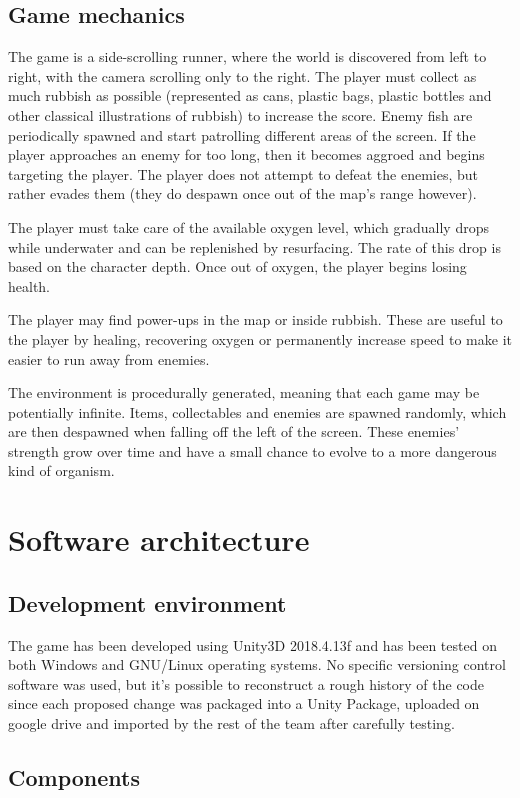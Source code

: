 \documentclass[11pt]{article}
\begin{document}
\subsection{Game mechanics}
The game is a side-scrolling runner, where the world is discovered from left to right, with the camera scrolling only to the right. The player must collect as much rubbish as possible (represented as cans, plastic bags, plastic bottles and other classical illustrations of rubbish) to increase the score. Enemy fish are periodically spawned and start patrolling different areas of the screen. If the player approaches an enemy for too long, then it becomes aggroed and begins targeting the player. The player does not attempt to defeat the enemies, but rather evades them (they do despawn once out of the map’s range however).

The player must take care of the available oxygen level, which gradually drops while underwater and can be replenished by resurfacing. The rate of this drop is based on the character depth. Once out of oxygen, the player begins losing health.

The player may find power-ups in the map or inside rubbish. These are useful to the player by healing, recovering oxygen or permanently increase speed to make it easier to run away from enemies.

The environment is procedurally generated, meaning that each game may be potentially infinite. Items, collectables and enemies are spawned randomly, which are then despawned when falling off the left of the screen. These enemies’ strength grow over time and have a small chance to evolve to a more dangerous kind of organism.

\section{Software architecture}
\subsection{Development environment}
The game has been developed using Unity3D 2018.4.13f and has been tested on both Windows and GNU/Linux operating systems. No specific versioning control software was used, but it’s possible to reconstruct a rough history of the code since each proposed change was packaged into a Unity Package, uploaded on google drive and imported by the rest of the team after carefully testing.

\subsection{Components}
\end{document}
